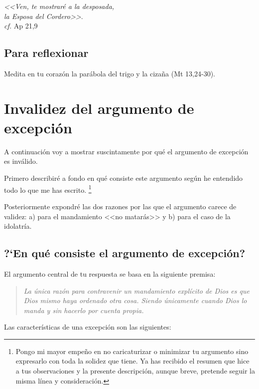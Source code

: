 \documentclass{article}
\begin{document}
\begin{flushright}
\emph{<<Ven, te mostrar\'e a la desposada,\\
la Esposa del Cordero>>}.\\
\emph{cf.} Ap 21,9
\end{flushright}

\subsection{Para reflexionar}

Medita en tu coraz\'on la par\'abola del trigo y la ciza\~na (Mt 13,24-30).

\section{Invalidez del argumento de excepci\'on}

A continuaci\'on voy a mostrar suscintamente por qu\'e el argumento de excepci\'on es inv\'alido. 

Primero describir\'e a fondo en qu\'e consiste este argumento seg\'un he entendido todo lo que me has escrito.%
    \footnote{Pongo mi mayor empe\~no en no caricaturizar o minimizar tu argumento sino expresarlo con toda la solidez que tiene. Ya has recibido el resumen que hice a tus observaciones y la presente descripci\'on, aunque breve, pretende seguir la misma l\'{i}nea y consideraci\'on.}

Posteriormente expondr\'e las dos razones por las que el argumento carece de validez: a) para el mandamiento <<no matar\'as>> y b) para el caso de la idolatr\'{i}a.

\subsection{?`En qu\'e consiste el argumento de excepci\'on?}

El argumento central de tu respuesta se basa en la siguiente premisa:

\begin{quote}
\emph{La \'unica raz\'on para contravenir un mandamiento expl\'{i}cito de Dios es que Dios mismo haya ordenado otra cosa. Siendo \'unicamente cuando Dios lo manda y sin hacerlo por cuenta propia.}
\end{quote}

\noindent
Las caracter\'{i}sticas de una excepci\'on son las siguientes:
\end{document}

